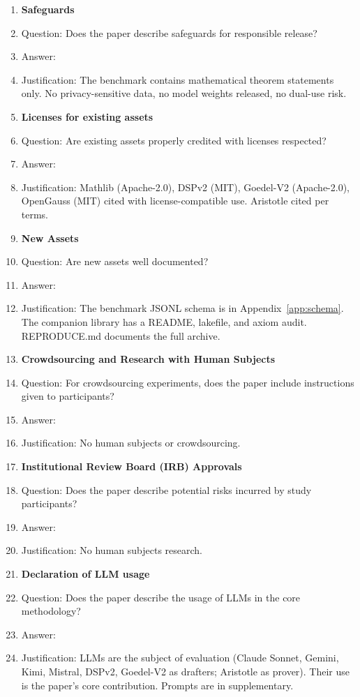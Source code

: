 \begin{enumerate}
\item {\bf Safeguards}
    \item[] Question: Does the paper describe safeguards for responsible release?
    \item[] Answer: \answerNA{}
    \item[] Justification: The benchmark contains mathematical theorem statements only. No privacy-sensitive data, no model weights released, no dual-use risk.

\item {\bf Licenses for existing assets}
    \item[] Question: Are existing assets properly credited with licenses respected?
    \item[] Answer: \answerYes{}
    \item[] Justification: Mathlib (Apache-2.0), DSPv2 (MIT), Goedel-V2 (Apache-2.0), OpenGauss (MIT) cited with license-compatible use. Aristotle cited per terms.

\item {\bf New Assets}
    \item[] Question: Are new assets well documented?
    \item[] Answer: \answerYes{}
    \item[] Justification: The benchmark JSONL schema is in Appendix~\ref{app:schema}. The companion library has a README, lakefile, and axiom audit. REPRODUCE.md documents the full archive.

\item {\bf Crowdsourcing and Research with Human Subjects}
    \item[] Question: For crowdsourcing experiments, does the paper include instructions given to participants?
    \item[] Answer: \answerNA{}
    \item[] Justification: No human subjects or crowdsourcing.

\item {\bf Institutional Review Board (IRB) Approvals}
    \item[] Question: Does the paper describe potential risks incurred by study participants?
    \item[] Answer: \answerNA{}
    \item[] Justification: No human subjects research.

\item {\bf Declaration of LLM usage}
    \item[] Question: Does the paper describe the usage of LLMs in the core methodology?
    \item[] Answer: \answerYes{}
    \item[] Justification: LLMs are the subject of evaluation (Claude Sonnet, Gemini, Kimi, Mistral, DSPv2, Goedel-V2 as drafters; Aristotle as prover). Their use is the paper's core contribution. Prompts are in supplementary.

\end{enumerate}
